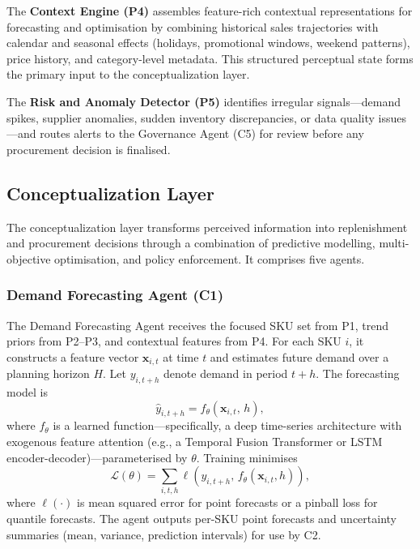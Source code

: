 \documentclass[utf8]{FrontiersinHarvard}
\begin{document}
	The \textbf{Context Engine (P4)} assembles feature-rich contextual
	representations for forecasting and optimisation by combining historical
	sales trajectories with calendar and seasonal effects (holidays,
	promotional windows, weekend patterns), price history, and category-level
	metadata.  This structured perceptual state forms the primary input to the
	conceptualization layer.

	The \textbf{Risk and Anomaly Detector (P5)} identifies irregular
	signals---demand spikes, supplier anomalies, sudden inventory discrepancies,
	or data quality issues---and routes alerts to the Governance Agent (C5) for
	review before any procurement decision is finalised.

	\subsection{Conceptualization Layer}
	\label{sec:conceptualization}

	The conceptualization layer transforms perceived information into
	replenishment and procurement decisions through a combination of predictive
	modelling, multi-objective optimisation, and policy enforcement.  It
	comprises five agents.

	\subsubsection{Demand Forecasting Agent (C1)}

	The Demand Forecasting Agent receives the focused SKU set from P1, trend
	priors from P2--P3, and contextual features from P4.  For each SKU $i$,
	it constructs a feature vector $\mathbf{x}_{i,t}$ at time $t$ and
	estimates future demand over a planning horizon $H$.  Let
	$y_{i,t+h}$ denote demand in period $t+h$.  The forecasting model is
	\begin{equation}
		\label{eq:forecast}
		\hat{y}_{i,t+h} = f_\theta(\mathbf{x}_{i,t},\, h),
	\end{equation}
	where $f_\theta$ is a learned function---specifically, a deep time-series
	architecture with exogenous feature attention (e.g., a Temporal Fusion
	Transformer or LSTM encoder-decoder)---parameterised by $\theta$.
	Training minimises
	\begin{equation}
		\label{eq:loss}
		\mathcal{L}(\theta) =
		\sum_{i,t,h} \ell\!\left(y_{i,t+h},\, f_\theta(\mathbf{x}_{i,t},h)\right),
	\end{equation}
	where $\ell(\cdot)$ is mean squared error for point forecasts or a
	pinball loss for quantile forecasts.  The agent outputs per-SKU point
	forecasts and uncertainty summaries (mean, variance, prediction intervals)
	for use by C2.
\end{document}
